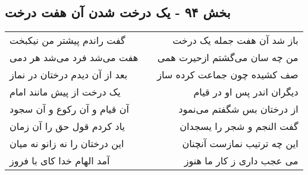 \begin{center}
\section*{بخش ۹۴ - یک درخت شدن آن هفت درخت}
\label{sec:sh094}
\begin{longtable}{l p{0.5cm} r}
گفت راندم پیشتر من نیکبخت
&&
باز شد آن هفت جمله یک درخت
\\
هفت می‌شد فرد می‌شد هر دمی
&&
من چه سان می‌گشتم ازحیرت همی
\\
بعد از آن دیدم درختان در نماز
&&
صف کشیده چون جماعت کرده ساز
\\
یک درخت از پیش مانند امام
&&
دیگران اندر پس او در قیام
\\
آن قیام و آن رکوع و آن سجود
&&
از درختان بس شگفتم می‌نمود
\\
یاد کردم قول حق را آن زمان
&&
گفت النجم و شجر را یسجدان
\\
این درختان را نه زانو نه میان
&&
این چه ترتیب نمازست آنچنان
\\
آمد الهام خدا کای با فروز
&&
می عجب داری ز کار ما هنوز
\\
\end{longtable}
\end{center}
